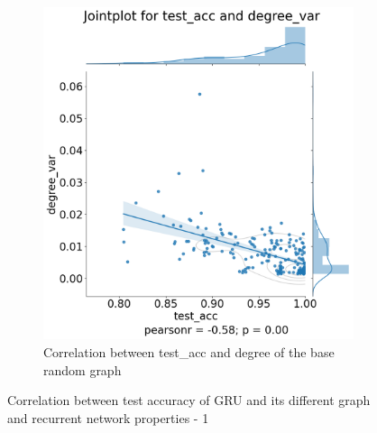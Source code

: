 \begin{figure}[H]
\begin{subfigure}{0.45\textwidth}
        \includegraphics[width=\linewidth]{images/results/random/gru/jointplot_test_acc_degree_var.png}
        \caption{Correlation between test\_acc and degree of the base random graph} \label{fig:jp_gru_degree}
    \end{subfigure}

\caption[Correlation between test accuracy of GRU and its different graph and recurrent network properties - 1]{Correlation between test accuracy of GRU and its different graph and recurrent network properties - 1} \label{fig:gru_correlation_1}
\end{figure}

